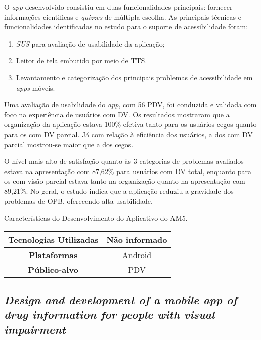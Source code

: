 O \emph{app} desenvolvido consistiu em duas funcionalidades principais: fornecer informações cientificas e \emph{quizzes} de múltipla escolha.
As principais técnicas e funcionalidades identificadas no estudo para o suporte de acessibilidade foram:

\begin{enumerate}
  \item \emph{SUS} para avaliação de usabilidade da aplicação;
  \item Leitor de tela embutido por meio de TTS\@.
  \item Levantamento e categorização dos principais problemas de acessibilidade em \emph{apps} móveis.
\end{enumerate}

Uma avaliação de usabilidade do \emph{app}, com 56 PDV, foi conduzida e validada com foco na experiência de usuários com DV\@.
Os resultados mostraram que a organização da aplicação estava 100\% efetiva tanto para os usuários cegos quanto para os com DV parcial.
Já com relação à eficiência dos usuários, a dos com DV parcial mostrou-se maior que a dos cegos.

O nível mais alto de satisfação quanto às 3 categorias de problemas avaliados estava na apresentação com
87,62\% para usuários com DV total, enquanto para os com visão parcial estava tanto na organização quanto
na apresentação com 89,21\%.
No geral, o estudo indica que a aplicação reduziu a gravidade dos problemas de OPB, oferecendo alta usabilidade.

\begin{quadro}[htb!]
  \caption{\label{qua-car-am5}Características do Desenvolvimento do Aplicativo do AM5.}
  \begin{tabular}{|c|c|}
    \hline
    \textbf{Tecnologias Utilizadas} & Não informado \\ \hline
    \textbf{Plataformas}            & Android       \\ \hline
    \textbf{Público-alvo}           & PDV           \\
    \hline
  \end{tabular}
\end{quadro}

\subsection{\emph{Design and development of a mobile app of drug information for people with visual impairment}}

